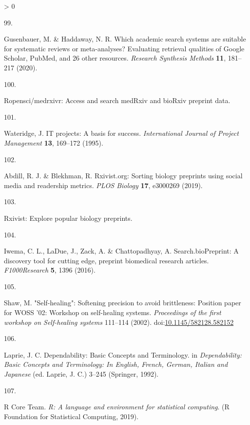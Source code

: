 \documentclass[a4paper, twoside]{templates/ociamthesis}
\newlength{\cslhangindent}
\newlength{\csllabelwidth}
\newenvironment{CSLReferences}[3] %
 {%
  \setlength{\parindent}{0pt}
  \ifodd #1 \everypar{\setlength{\hangindent}{\cslhangindent}}\ignorespaces\fi
  \ifnum #2 > 0
  \setlength{\parskip}{#2\baselineskip}
  \fi
 }%
 {}
\newcommand{\CSLLeftMargin}[1]{\parbox[t]{\maxof{\widthof{#1}}{\csllabelwidth}}{#1}}
\newcommand{\CSLRightInline}[1]{\parbox[t]{\linewidth - \csllabelwidth}{#1}}
\begin{document}
\begin{CSLReferences}{0}{0}
\leavevmode\hypertarget{ref-gusenbauer2020}{}%
\CSLLeftMargin{99. }
\CSLRightInline{Gusenbauer, M. \& Haddaway, N. R. Which academic search systems are suitable for systematic reviews or meta-analyses? {Evaluating} retrieval qualities of {Google Scholar}, {PubMed}, and 26 other resources. \emph{Research Synthesis Methods} \textbf{11}, 181--217 (2020).}

\leavevmode\hypertarget{ref-zotero-15029}{}%
\CSLLeftMargin{100. }
\CSLRightInline{Ropensci/medrxivr: {Access} and search {medRxiv} and {bioRxiv} preprint data.}

\leavevmode\hypertarget{ref-wateridge1995}{}%
\CSLLeftMargin{101. }
\CSLRightInline{Wateridge, J. {IT} projects: A basis for success. \emph{International Journal of Project Management} \textbf{13}, 169--172 (1995).}

\leavevmode\hypertarget{ref-abdill2019}{}%
\CSLLeftMargin{102. }
\CSLRightInline{Abdill, R. J. \& Blekhman, R. Rxivist.org: {Sorting} biology preprints using social media and readership metrics. \emph{PLOS Biology} \textbf{17}, e3000269 (2019).}

\leavevmode\hypertarget{ref-zotero-15027}{}%
\CSLLeftMargin{103. }
\CSLRightInline{Rxivist: {Explore} popular biology preprints.}

\leavevmode\hypertarget{ref-iwema2016}{}%
\CSLLeftMargin{104. }
\CSLRightInline{Iwema, C. L., LaDue, J., Zack, A. \& Chattopadhyay, A. Search.{bioPreprint}: A discovery tool for cutting edge, preprint biomedical research articles. \emph{F1000Research} \textbf{5}, 1396 (2016).}

\leavevmode\hypertarget{ref-shaw2002}{}%
\CSLLeftMargin{105. }
\CSLRightInline{Shaw, M. "{Self}-healing": Softening precision to avoid brittleness: Position paper for {WOSS} '02: Workshop on self-healing systems. \emph{Proceedings of the first workshop on Self-healing systems} 111--114 (2002). doi:\href{https://doi.org/10.1145/582128.582152}{10.1145/582128.582152}}

\leavevmode\hypertarget{ref-laprie1992}{}%
\CSLLeftMargin{106. }
\CSLRightInline{Laprie, J. C. Dependability: {Basic Concepts} and {Terminology}. in \emph{Dependability: {Basic Concepts} and {Terminology}: {In English}, {French}, {German}, {Italian} and {Japanese}} (ed. Laprie, J. C.) 3--245 ({Springer}, 1992).}

\leavevmode\hypertarget{ref-rcoreteam2019}{}%
\CSLLeftMargin{107. }
\CSLRightInline{R Core Team. \emph{R: {A} language and environment for statistical computing}. ({R Foundation for Statistical Computing}, 2019).}


\end{CSLReferences}
\end{document}
